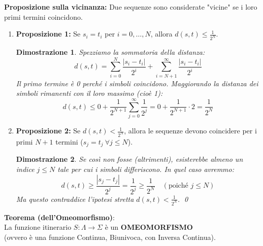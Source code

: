 \documentclass[openany]{book}
\newtheorem*{dimostrazione}{Dimostrazione}
\theoremstyle{definition}
\theoremstyle{remark}
\begin{document}
\vspace{1.5em}
\textbf{Proposizione sulla vicinanza: }
Due sequenze sono considerate "vicine" se i loro primi termini coincidono.

\begin{enumerate}
    \item \textbf{Proposizione 1:} Se $s_i = t_i$ per $i = 0, \dots, N$, allora $d(s, t) \leq \frac{1}{2^N}$.
    
    \begin{dimostrazione}
    Spezziamo la sommatoria della distanza:
    $$ d(s, t) = \sum_{i=0}^{N} \frac{|s_i - t_i|}{2^i} + \sum_{i=N+1}^{\infty} \frac{|s_i - t_i|}{2^i} $$
    Il primo termine è 0 perché i simboli coincidono. Maggiorando la distanza dei simboli rimanenti con il loro massimo (cioè 1):
    $$ d(s, t) \leq 0 + \frac{1}{2^{N+1}} \sum_{j=0}^{\infty} \frac{1}{2^j} = 0 + \frac{1}{2^{N+1}} \cdot 2 = \frac{1}{2^N} $$
    \end{dimostrazione}
    
    \item \textbf{Proposizione 2:} Se $d(s, t) < \frac{1}{2^N}$, allora le sequenze devono coincidere per i primi $N+1$ termini ($s_j = t_j \ \forall j \leq N$).
    
    \begin{dimostrazione}
    Se così non fosse (altrimenti), esisterebbe almeno un indice $j \leq N$ tale per cui i simboli differiscono. In quel caso avremmo:
    $$ d(s, t) \geq \frac{|s_j - t_j|}{2^j} = \frac{1}{2^j} \geq \frac{1}{2^N} \quad (\text{poiché } j \leq N) $$
    Ma questo contraddice l'ipotesi stretta $d(s,t) < \frac{1}{2^N}$. \qed
    \end{dimostrazione}
\end{enumerate}


\textbf{Teorema (dell'Omeomorfismo)}: \\
La funzione itinerario $S: \Lambda \to \Sigma$ è un \textbf{OMEOMORFISMO} \\
(ovvero è una funzione Continua, Biunivoca, con Inversa Continua).
\end{document}
